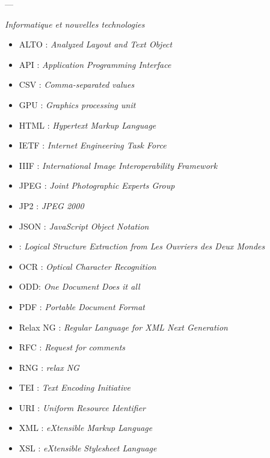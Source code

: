 \begin{center}---

\bigbreak

\textit{Informatique et nouvelles technologies}
\end{center} 

\bigbreak

\begin{itemize}
    \item ALTO : \textit{Analyzed Layout and Text Object}
    \item API : \textit{Application Programming Interface}
    \item CSV : \textit{Comma-separated values}
    \item GPU : \textit{Graphics processing unit}
    \item HTML : \textit{Hypertext Markup Language}
    \item IETF : \textit{Internet Engineering Task Force}
    \item IIIF : \textit{International Image Interoperability Framework}
    \item JPEG : \textit{Joint Photographic Experts Group}
    \item JP2 : \textit{JPEG 2000}
    \item JSON : \textit{JavaScript Object Notation}
    \item \lse{} : \textit{Logical Structure Extraction from Les Ouvriers des Deux Mondes}
    \item OCR : \textit{Optical Character Recognition}
    \item ODD: \textit{One Document Does it all}
    \item PDF : \textit{Portable Document Format}
    \item Relax NG : \textit{Regular Language for XML Next Generation}
    \item RFC : \textit{Request for comments}
    \item RNG : \cf{} \textit{relax NG}
    \item TEI : \textit{Text Encoding Initiative}
    \item URI : \textit{Uniform Resource Identifier}
    \item XML : \textit{eXtensible Markup Language}
    \item XSL : \textit{eXtensible Stylesheet Language}
\end{itemize}

\clearpage
\thispagestyle{empty}